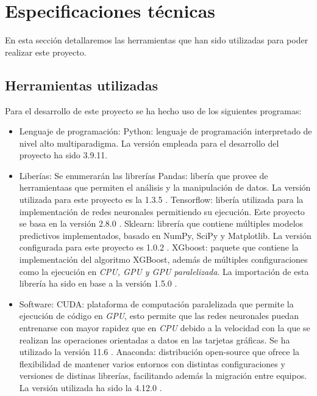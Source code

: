     \section{Especificaciones técnicas}

        En esta sección detallaremos las herramientas que han sido utilizadas para poder realizar este proyecto.


        \subsection{Herramientas utilizadas}
            Para el desarrollo de este proyecto se ha hecho uso de los siguientes programas:

            \begin{itemize}
                \item Lenguaje de programación:
                    \subitem Python: lenguaje de programación interpretado de nivel alto multiparadigma. La versión empleada para el desarrollo del proyecto ha sido 3.9.11.
                \item Liberías: Se enumerarán las librerías 
                    \subitem Pandas: libería que provee de herramientaas que permiten el análisis y la manipulación de datos. La versión utilizada para este proyecto es la 1.3.5 \cite{Pandas}. 
                    \subitem Tensorflow: libería utilizada para la implementación de redes neuronales permitiendo su ejecución. Este proyecto se basa en la versión 2.8.0 \cite{Tensorflow}.
                    \subitem Sklearn: librería que contiene múltiples modelos predictivos implementados, basado en NumPy, SciPy y Matplotlib. La versión configurada para este proyecto es 1.0.2 \cite{Scikit-Learn}.
                    \subitem XGboost: paquete que contiene la implementación del algoritmo XGBoost, además de múltiples configuraciones como la ejecución en \textit{CPU, GPU y GPU paralelizada}. La importación de esta librería ha sido en base a la versión 1.5.0 \cite{XGBoostLibrary}.
                \item Software:
                    \subitem CUDA: plataforma de computación paralelizada que permite la ejecución de código en \textit{GPU}, esto permite que las redes neuronales puedan entrenarse con mayor rapidez que en \textit{CPU} debido a la velocidad con la que se realizan las operaciones orientadas a datos en las tarjetas gráficas. Se ha utilizado la versión 11.6 \cite{CUDA}. 
                    \subitem Anaconda: distribución open-source que ofrece la flexibilidad de mantener varios entornos con distintas configuraciones y versiones de distinas librerías, facilitando además la migración entre equipos. La versión utilizada ha sido la 4.12.0 \cite{Anaconda}.

\end{itemize}
